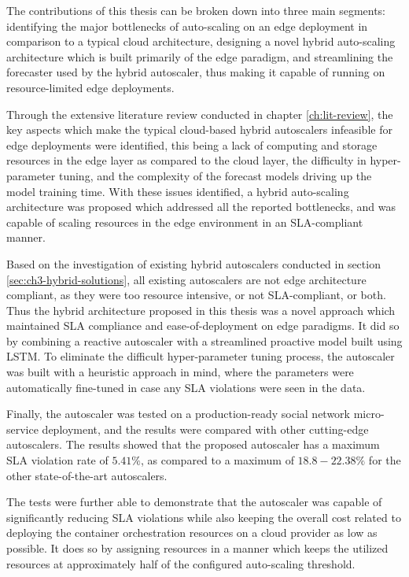 The contributions of this thesis can be broken down into three main segments: identifying the major bottlenecks of auto-scaling on an edge deployment in comparison to a typical cloud architecture, designing a novel hybrid auto-scaling architecture which is built primarily of the edge paradigm, and streamlining the forecaster used by the hybrid autoscaler, thus making it capable of running on resource-limited edge deployments.\par

Through the extensive literature review conducted in chapter \ref{ch:lit-review}, the key aspects which make the typical cloud-based hybrid autoscalers infeasible  for edge deployments were identified, this being a lack of computing and storage resources in the edge layer as compared to the cloud layer, the difficulty in hyper-parameter tuning, and the complexity of the forecast models driving up the model training time. With these issues identified, a hybrid auto-scaling architecture was proposed which addressed all the reported bottlenecks, and was capable of scaling resources in the edge environment in an SLA-compliant manner.\par

Based on the investigation of existing hybrid autoscalers conducted in section \ref{sec:ch3-hybrid-solutions}, all existing autoscalers are not edge architecture compliant, as they were too resource intensive, or not SLA-compliant, or both. Thus the hybrid architecture proposed in this thesis was a novel approach which maintained SLA compliance and ease-of-deployment on edge paradigms. It did so by combining a reactive autoscaler with a streamlined proactive model built using LSTM. To eliminate the difficult hyper-parameter tuning process, the autoscaler was built with a heuristic approach in mind, where the parameters were automatically fine-tuned in case any SLA violations were seen in the data.\par

Finally, the autoscaler was tested on a production-ready social network micro-service deployment, and the results were compared with other cutting-edge autoscalers. The results showed that the proposed autoscaler has a maximum SLA violation rate of $5.41\%$, as compared to a maximum of $18.8-22.38\%$ for the other state-of-the-art autoscalers.\par

The tests were further able to demonstrate that the autoscaler was capable of significantly reducing SLA violations while also keeping the overall cost related to deploying the container orchestration resources on a cloud provider as low as possible. It does so by assigning resources in a manner which keeps the utilized resources at approximately half of the configured auto-scaling threshold.\par

